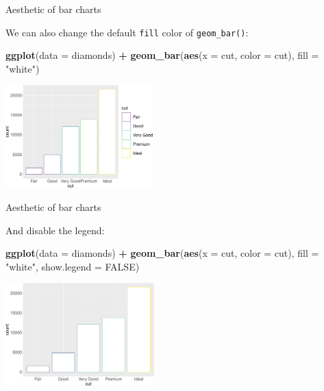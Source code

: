 \documentclass[ignorenonframetext,]{beamer}
\newenvironment{Shaded}{\begin{snugshade}}{\end{snugshade}}
\newcommand{\DataTypeTok}[1]{\textcolor[rgb]{0.13,0.29,0.53}{#1}}
\newcommand{\KeywordTok}[1]{\textcolor[rgb]{0.13,0.29,0.53}{\textbf{#1}}}
\newcommand{\NormalTok}[1]{#1}
\newcommand{\OperatorTok}[1]{\textcolor[rgb]{0.81,0.36,0.00}{\textbf{#1}}}
\newcommand{\OtherTok}[1]{\textcolor[rgb]{0.56,0.35,0.01}{#1}}
\newcommand{\StringTok}[1]{\textcolor[rgb]{0.31,0.60,0.02}{#1}}
\begin{document}
\begin{frame}[fragile]{Aesthetic of bar charts}
\protect\hypertarget{aesthetic-of-bar-charts-1}{}

We can also change the default \texttt{fill} color of
\texttt{geom\_bar()}:

\begin{Shaded}
\begin{Highlighting}[]
\KeywordTok{ggplot}\NormalTok{(}\DataTypeTok{data =}\NormalTok{ diamonds) }\OperatorTok{+}\StringTok{ }
\StringTok{  }\KeywordTok{geom_bar}\NormalTok{(}\KeywordTok{aes}\NormalTok{(}\DataTypeTok{x =}\NormalTok{ cut, }\DataTypeTok{color =}\NormalTok{ cut), }\DataTypeTok{fill =} \StringTok{"white"}\NormalTok{)}
\end{Highlighting}
\end{Shaded}

\begin{center}\includegraphics[height=150px]{data-visualization_files/figure-beamer/unnamed-chunk-124-1} \end{center}

\end{frame}

\begin{frame}[fragile]{Aesthetic of bar charts}
\protect\hypertarget{aesthetic-of-bar-charts-2}{}

And disable the legend:

\begin{Shaded}
\begin{Highlighting}[]
\KeywordTok{ggplot}\NormalTok{(}\DataTypeTok{data =}\NormalTok{ diamonds) }\OperatorTok{+}\StringTok{ }
\StringTok{  }\KeywordTok{geom_bar}\NormalTok{(}\KeywordTok{aes}\NormalTok{(}\DataTypeTok{x =}\NormalTok{ cut, }\DataTypeTok{color =}\NormalTok{ cut),}
           \DataTypeTok{fill =} \StringTok{"white"}\NormalTok{, }\DataTypeTok{show.legend =} \OtherTok{FALSE}\NormalTok{)}
\end{Highlighting}
\end{Shaded}

\begin{center}\includegraphics[height=150px]{data-visualization_files/figure-beamer/unnamed-chunk-125-1} \end{center}

\end{frame}
\end{document}

